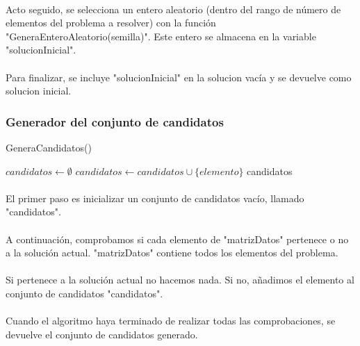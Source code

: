 \documentclass{article}
\begin{document}
		\paragraph{}Acto seguido, se selecciona un entero aleatorio (dentro del rango de número de elementos del problema a resolver) con la función "GeneraEnteroAleatorio(semilla)". Este entero se almacena en la variable "solucionInicial".
		
		\paragraph{}Para finalizar, se incluye "solucionInicial" en la solucion vacía y se devuelve como solucion inicial.

	\subsubsection{Generador del conjunto de candidatos}
	\begin{algorithm}[H]
		\caption{GeneraCandidatos()}
		\begin{algorithmic}
			\STATE $candidatos \leftarrow \emptyset$
			\STATE $candidatos \leftarrow candidatos \cup \{elemento\}$
			\ENDIF
			\ENDFOR
			\RETURN candidatos
		\end{algorithmic}
	\end{algorithm}

	\paragraph{}El primer paso es inicializar un conjunto de candidatos vacío, llamado "candidatos".
	
	\paragraph{}A continuación, comprobamos si cada elemento de "matrizDatos" pertenece o no a la solución actual. "matrizDatos" contiene todos los elementos del problema.
	
	\paragraph{}Si pertenece a la solución actual no hacemos nada. Si no, añadimos el elemento al conjunto de candidatos "candidatos".
	
	\paragraph{}Cuando el algoritmo haya terminado de realizar todas las comprobaciones, se devuelve el conjunto de candidatos generado.
\end{document}
